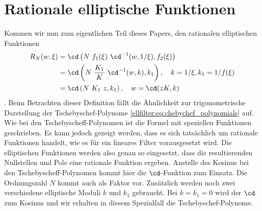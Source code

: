 \section{Rationale elliptische Funktionen}

Kommen wir nun zum eigentlichen Teil dieses Papers, den rationalen elliptischen Funktionen
%
%
\begin{align}
    R_N(w, \xi) &= \cd \left(N~f_1(\xi)~\cd^{-1}(w, 1/\xi), f_2(\xi)\right) \label{ellfilter:eq:elliptic}\\
                &= \cd \left(N~\frac{K_1}{K}~\cd^{-1}(w, k), k_1\right) , \quad k= 1/\xi, k_1 = 1/f(\xi) \\
                &= \cd \left(N~K_1~z , k_1 \right), \quad w= \cd(z K, k)
\end{align}
\cite{ellfilter:bib:orfanidis}.
Beim Betrachten dieser Definition fällt die Ähnlichkeit zur trigonometrische Darstellung der Tsche\-byschef-Polynome \eqref{ellfilter:eq:chebychef_polynomials} auf.
Wie bei den Tschebyscheff-Polynomen ist die Formel mit speziellen Funktionen geschrieben.
Es kann jedoch gezeigt werden, dass es sich tatsächlich um rationale Funktionen handelt, wie es für ein lineares Filter vorausgesetzt wird.
Die elliptischen Funktionen werden also genau so eingesetzt, dass die resultierenden Nullstellen und Pole eine rationale Funktion ergeben.
Anstelle des Kosinus bei den Tschebyscheff-Polynomen kommt hier die $\cd$-Funktion zum Einsatz.
Die Ordnungszahl $N$ kommt auch als Faktor vor.
Zusätzlich werden noch zwei verschiedene elliptische Moduli $k$ und $k_1$ gebraucht.
Bei $k = k_1 = 0$ wird der $\cd$ zum Kosinus und wir erhalten in diesem Spezialfall die Tschebyschef-Polynome.


